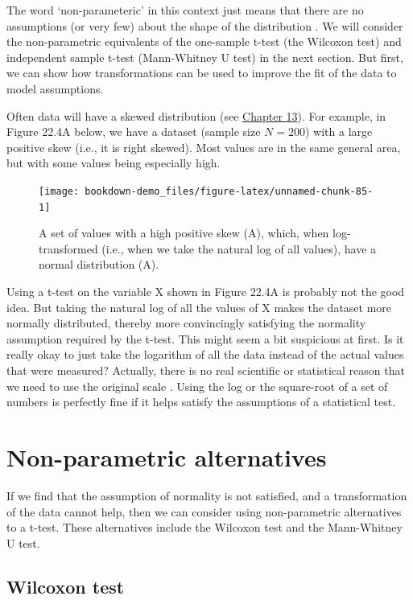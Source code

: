 \documentclass[
  openany]{scrbook}
\begin{document}
The word `non-parameteric' in this context just means that there are no assumptions (or very few) about the shape of the distribution \citep{Dytham2011}.
We will consider the non-parametric equivalents of the one-sample t-test (the Wilcoxon test) and independent sample t-test (Mann-Whitney U test) in the next section.
But first, we can show how transformations can be used to improve the fit of the data to model assumptions.

Often data will have a skewed distribution (see \protect\hyperlink{Chapter_13}{Chapter 13}).
For example, in Figure 22.4A below, we have a dataset (sample size \(N = 200\)) with a large positive skew (i.e., it is right skewed).
Most values are in the same general area, but with some values being especially high.

\begin{figure}
\texttt{[image: bookdown-demo\_files/figure-latex/unnamed-chunk-85-1]} \caption{A set of values with a high positive skew (A), which, when log-transformed (i.e., when we take the natural log of all values), have a normal distribution (A).}\label{fig:unnamed-chunk-85}
\end{figure}

Using a t-test on the variable X shown in Figure 22.4A is probably not the good idea.
But taking the natural log of all the values of X makes the dataset more normally distributed, thereby more convincingly satisfying the normality assumption required by the t-test.
This might seem a bit suspicious at first.
Is it really okay to just take the logarithm of all the data instead of the actual values that were measured?
Actually, there is no real scientific or statistical reason that we need to use the original scale \citep{Sokal1995}.
Using the log or the square-root of a set of numbers is perfectly fine if it helps satisfy the assumptions of a statistical test.

\hypertarget{non-parametric-alternatives}{%
\section{Non-parametric alternatives}\label{non-parametric-alternatives}}

If we find that the assumption of normality is not satisfied, and a transformation of the data cannot help, then we can consider using non-parametric alternatives to a t-test.
These alternatives include the Wilcoxon test and the Mann-Whitney U test.

\hypertarget{wilcoxon-test}{%
\subsection{Wilcoxon test}\label{wilcoxon-test}}
\end{document}

